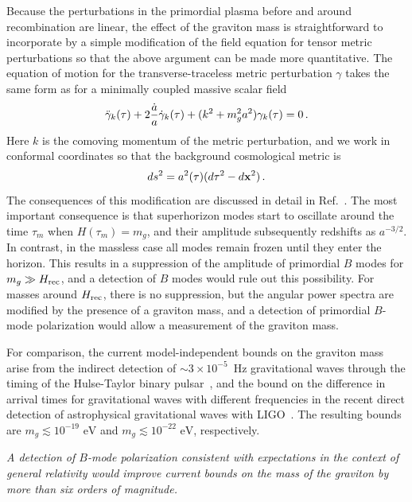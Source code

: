 Because the perturbations in the primordial plasma before and around recombination are linear, the effect of the graviton mass is straightforward to incorporate by a simple modification of the field equation for tensor metric perturbations so that the above argument can be made more quantitative. The equation of motion for the transverse-traceless metric perturbation $\gamma$ takes the same form as for a minimally coupled massive scalar field
\begin{equation}
\label{massive}
\ddot{\gamma}_k(\tau)+2{\dot a\over a} \dot{\gamma}_k(\tau)+(k^2+m_g^2 a^2) \gamma_k(\tau)=0\,.
\end{equation}
Here $k$ is the comoving momentum of the metric perturbation, and we work in conformal coordinates so that the background cosmological metric is
\begin{equation}
ds^2= a^2(\tau)(d\tau^2-d{\bf x}^2)\,.
\end{equation}
The consequences of this modification are discussed in detail in Ref.~\cite{Dubovsky:2009xk}. The most important consequence is that superhorizon modes start to oscillate around the time $\tau_m$ when $H(\tau_m)=m_g$, and their amplitude subsequently redshifts as $a^{-3/2}$. In contrast, in the massless case all modes remain frozen until they enter the horizon. This results in a suppression of the amplitude of primordial $B$ modes for $m_g\gg H_{\rm rec}$, and a detection of $B$ modes would rule out this possibility. For masses around $H_{\rm rec}$, there is no suppression, but the angular power spectra are modified by the presence of a graviton mass, and a detection of primordial $B$-mode polarization would allow a measurement of the graviton mass. 
 
For comparison, the current model-independent bounds on the graviton mass arise from the indirect detection of $\sim 3\times 10^{-5}$~Hz gravitational waves through the timing of the Hulse-Taylor binary pulsar~\cite{Finn:2001qi}, and the bound on the difference in arrival times for gravitational waves with different frequencies in the recent direct detection of astrophysical gravitational waves with LIGO~\cite{Abbott:2016blz}. The resulting bounds are $m_g\lesssim 10^{-19}{\mbox{ eV}}$ and $m_g\lesssim 10^{-22}{\mbox{ eV}}$, respectively. 

{\it A detection of $B$-mode polarization consistent with expectations in the context of general relativity would improve current bounds on the mass of the graviton by more than six orders of magnitude.} 

